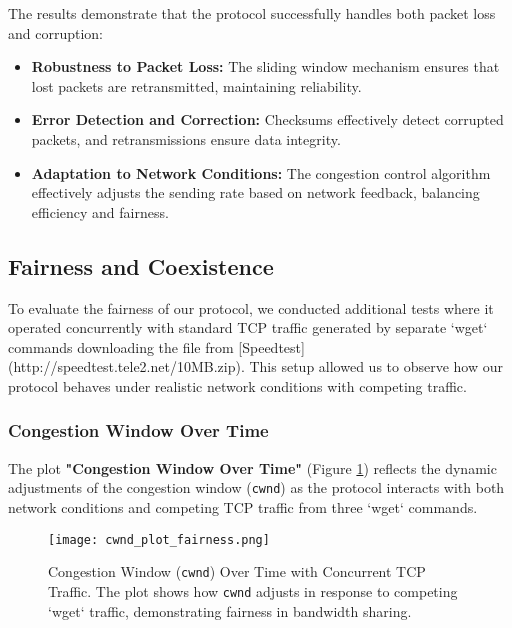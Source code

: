 \documentclass[11pt]{article}
\begin{document}
The results demonstrate that the protocol successfully handles both packet loss and corruption:

\begin{itemize}
    \item \textbf{Robustness to Packet Loss:} The sliding window mechanism ensures that lost packets are retransmitted, maintaining reliability.
    \item \textbf{Error Detection and Correction:} Checksums effectively detect corrupted packets, and retransmissions ensure data integrity.
    \item \textbf{Adaptation to Network Conditions:} The congestion control algorithm effectively adjusts the sending rate based on network feedback, balancing efficiency and fairness.
\end{itemize}

\subsection{Fairness and Coexistence}

To evaluate the fairness of our protocol, we conducted additional tests where it operated concurrently with standard TCP traffic generated by separate `wget` commands downloading the file from [Speedtest](http://speedtest.tele2.net/10MB.zip). This setup allowed us to observe how our protocol behaves under realistic network conditions with competing traffic.

\subsubsection{Congestion Window Over Time}

The plot \textbf{"Congestion Window Over Time"} (Figure \ref{fig:cwnd_fairness}) reflects the dynamic adjustments of the congestion window (\texttt{cwnd}) as the protocol interacts with both network conditions and competing TCP traffic from three `wget` commands.

\begin{figure}[H]
    \centering
    \texttt{[image: cwnd\_plot\_fairness.png]}
    \caption{Congestion Window (\texttt{cwnd}) Over Time with Concurrent TCP Traffic. The plot shows how \texttt{cwnd} adjusts in response to competing `wget` traffic, demonstrating fairness in bandwidth sharing.}
    \label{fig:cwnd_fairness}
\end{figure}
\end{document}
